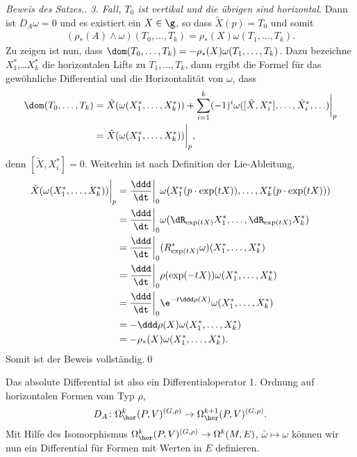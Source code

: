 \documentclass[%
	paper=a5,%
	fleqn,%
	DIV=18,%
	BCOR=0mm,
	fontsize=11pt,
	titlepage=false,%
	bibliography=totoc,
	DIV=18,%
	twoside=true,
	pdftitle=Riemannsche Geometrie,
	pdfauthor=Uwe Semmelmann,
	numbers=noendperiod]%
	{scrbook}
\begin{document}
\begin{proof}[Beweis des Satzes.]
\textit{3. Fall, $T_0$ ist vertikal und die übrigen sind horizontal}. Dann ist
$D_A\omega = 0$ und es existiert ein $X\in \g$, so dass $\widetilde{X}(p) = T_0$
und somit
\begin{align*}
(\rho_*(A)\wedge\omega)(T_0,\ldots,T_k) = 
\rho_*(X)\omega(T_1,\ldots,T_k).
\end{align*}
Zu zeigen ist nun, dass $\dom(T_0,\ldots,T_k) =
-\rho_*(X)\omega(T_1,\ldots,T_k)$. Dazu bezeichne $X_1^*$,\ldots $X_k^*$ die
horizontalen Lifts zu $T_1,\ldots,T_k$, dann ergibt die Formel für das
gewöhnliche Differential und die Horizontalität von $\omega$, dass
\begin{align*}
\dom(T_0,\ldots,T_k) &= 
\tilde{X}(\omega(X_1^*,\ldots,X_k^*))
+ \sum_{i=1}^k
(-1)^{i} 
\omega([\tilde{X},X_i^*],\ldots,\hat{X}_i^*,\ldots)
\bigg|_{p}
\\
&= \tilde{X}(\omega(X_1^*,\ldots,X_k^*))\bigg|_{p},
\end{align*}
denn $[\tilde{X},X_i^*] = 0$. Weiterhin ist nach Definition der Lie-Ableitung,
\begin{align*}
\tilde{X}(\omega(X_1^*,\ldots,X_k^*))\bigg|_{p} &= 
\frac{\ddd}{\dt}\bigg|_0
\omega(X_1^*(p\cdot \exp(tX)),\ldots,X_k^*(p\cdot \exp(tX)))\\
&=
\frac{\ddd}{\dt}\bigg|_0
\omega(\dR_{\exp(tX)}X_1^*,\ldots,\dR_{\exp(tX)}X_k^*)\\
&= \frac{\ddd}{\dt}\bigg|_0
(R_{\exp(tX)}^*\omega)(X_1^*,\ldots,X_k^*)\\
&= \frac{\ddd}{\dt}\bigg|_0
\rho(\exp(-tX))\omega(X_1^*,\ldots,X_k^*)\\
&= \frac{\ddd}{\dt}\bigg|_0
\e^{-t\ddd\rho(X)}\omega(X_1^*,\ldots,X_k^*)\\
&= -\ddd\rho(X)\omega(X_1^*,\ldots,X_k^*)\\
&= -\rho_*(X)\omega(X_1^*,\ldots,X_k^*).
\end{align*}
Somit ist der Beweis vollständig.\qed
\end{proof}


Das absolute Differential ist also ein Differentialoperator 1. Ordnung auf
horizontalen Formen vom Typ $\rho$,
\begin{align*}
D_A \colon \Omega_\hor^k(P,V)^{(G,\rho)}\to \Omega_\hor^{k+1}(P,V)^{(G,\rho)}.
\end{align*}
Mit Hilfe des Isomorphismus $\Omega_\hor^k(P,V)^{(G,\rho)}\to \Omega^k(M,E)$,
$\bar{\omega}\mapsto \omega$ können wir nun ein Differential für Formen
mit Werten in $E$ definieren.
\end{document}
